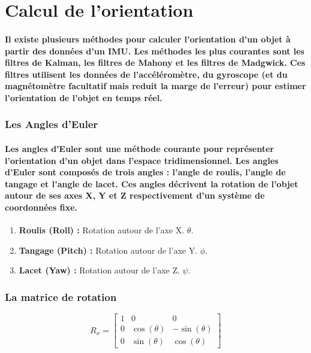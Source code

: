 \section{Calcul de l'orientation}

\paragraph{Il existe plusieurs méthodes pour calculer l'orientation d'un objet à partir des données d'un IMU. Les méthodes les plus courantes sont les filtres de Kalman, les filtres de Mahony et les filtres de Madgwick. Ces filtres utilisent les données de l'accéléromètre, du gyroscope (et du magnétomètre facultatif mais reduit la marge de l'erreur) pour estimer l'orientation de l'objet en temps réel.}

\subsubsection{Les Angles d'Euler}

\paragraph{Les angles d'Euler sont une méthode courante pour représenter l'orientation d'un objet dans l'espace tridimensionnel. Les angles d'Euler sont composés de trois angles : l'angle de roulis, l'angle de tangage et l'angle de lacet. Ces angles décrivent la rotation de l'objet autour de ses axes X, Y et Z respectivement d'un système de coordonnées fixe.}


\begin{enumerate}
	\item \textbf{Roulis (Roll) :} Rotation autour de l'axe X. $\theta$.
	\item \textbf{Tangage (Pitch) :} Rotation autour de l'axe Y. $\phi$.
	\item \textbf{Lacet (Yaw) :} Rotation autour de l'axe Z. $\psi$.
\end{enumerate}

\pagebreak

\subsubsection{La matrice de rotation}

\begin{equation*}
	R_x = \begin{bmatrix}
		1 & 0 & 0 \\
		0 & \cos(\theta) & -\sin(\theta) \\
		0 & \sin(\theta) & \cos(\theta)
	\end{bmatrix}
\end{equation*}

